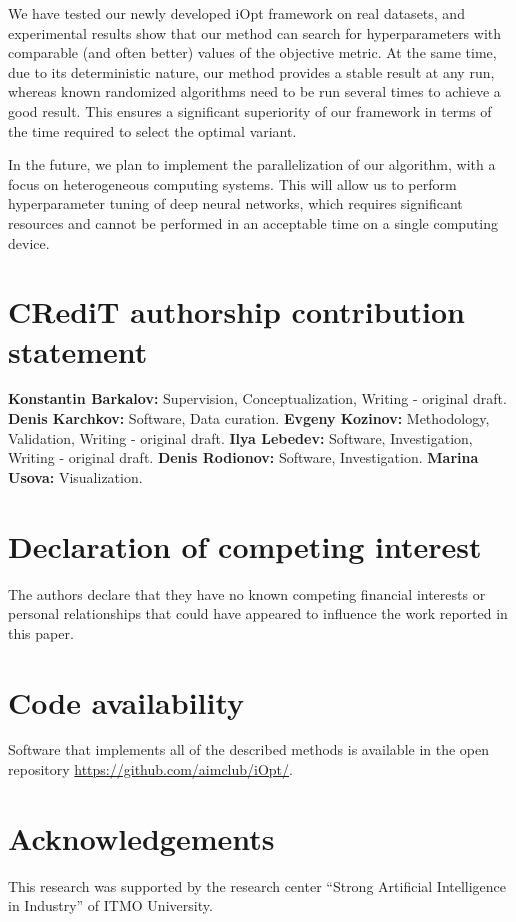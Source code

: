 \documentclass[preprint,12pt]{elsarticle}
\begin{document}
We have tested our newly developed iOpt framework on real datasets, and experimental results show that our method can search for hyperparameters with comparable (and often better) values of the objective metric. At the same time, due to its deterministic nature, our method provides a stable result at any run, whereas known randomized algorithms need to be run several times to achieve a good result. This ensures a significant superiority of our framework in terms of the time required to select the optimal variant.

In the future, we plan to implement the parallelization of our algorithm, with a focus on heterogeneous computing systems. This will allow us to perform hyperparameter tuning of deep neural networks, which requires significant resources and cannot be performed in an acceptable time on a single computing device.


\section*{CRediT authorship contribution statement}

\textbf{Konstantin Barkalov:} Supervision, Conceptualization, Writing - original draft.
\textbf{Denis Karchkov:} Software, Data curation.
\textbf{Evgeny Kozinov:} Methodology, Validation, Writing - original draft.
\textbf{Ilya Lebedev:} Software, Investigation, Writing - original draft.
\textbf{Denis Rodionov:} Software, Investigation.
\textbf{Marina Usova:} Visualization.


\section*{Declaration of competing interest}

The authors declare that they have no known competing financial interests or personal relationships that could have appeared to influence the work reported in this paper.

\section*{Code availability}
Software that implements all of the described methods is available in the open repository \url{https://github.com/aimclub/iOpt/}.

\section*{Acknowledgements}
This research was supported by the research center ``Strong Artificial Intelligence in Industry'' of ITMO University.
\end{document}
